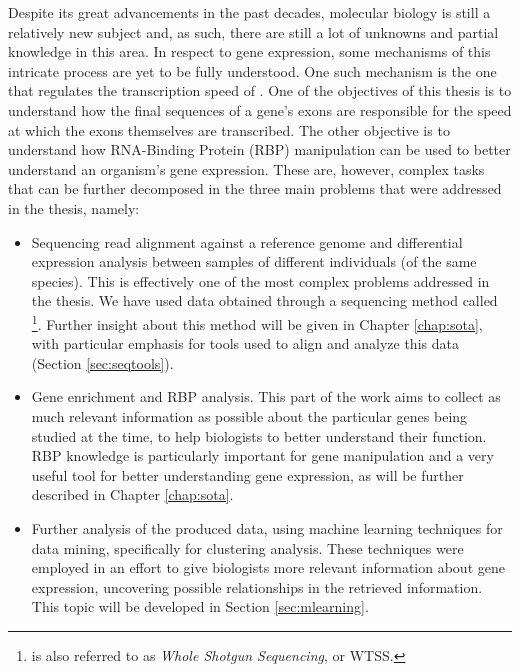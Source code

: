 Despite its great advancements in the past decades, molecular biology is still a
relatively new subject and, as such, there are still a lot of unknowns and
partial knowledge in this area. In respect to gene expression, some mechanisms
of this intricate process are yet to be fully understood. One such mechanism is
the one that regulates the transcription speed of \rna. One of the objectives of
this thesis is to understand how the final sequences of a gene's exons are
responsible for the speed at which the exons themselves are transcribed. The
other objective is to understand how RNA-Binding Protein (RBP) manipulation can
be used to better understand an organism's gene expression. These are, however,
complex tasks that can be further decomposed in the three main problems that
were addressed in the thesis, namely:

\begin{itemize}

  \item
  Sequencing read alignment against a reference genome and differential
  expression analysis between samples of different individuals (of the same
  species). This is effectively one of the most complex problems addressed in
  the thesis. We have used data obtained through a sequencing method called
  \rnaseq{}\footnote{\rnaseq{} is also referred to as \textit{Whole \Trans{}
  Shotgun Sequencing}, or WTSS.}. Further insight about this method will be
  given in Chapter \ref{chap:sota}, with particular emphasis for tools used to
  align and analyze this data (Section \ref{sec:seqtools}).

  \item
  Gene enrichment and RBP analysis. This part of the work aims to collect as
  much relevant information as possible about the particular genes being studied
  at the time, to help biologists to better understand their function. RBP
  knowledge is particularly important for gene manipulation and a very useful
  tool for better understanding gene expression, as will be further described in
  Chapter \ref{chap:sota}.

  \item
  Further analysis of the produced data, using machine learning techniques for
  data mining, specifically for clustering analysis. These techniques were
  employed in an effort to give biologists more relevant information about gene
  expression, uncovering possible relationships in the retrieved information.
  This topic will be developed in Section \ref{sec:mlearning}.

\end{itemize}

